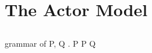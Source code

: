 \section{The Actor Model}



\subsection{\ActorPiCalc}

\begin{JDef}{grammar of \actorpicalc}
  P, Q
  \grmr \anullproc
  \altn {} . P
  \altn {}
  \altn {}
  \altn P \apar Q
  \altn {}
  \altn {}
\end{JDef}

